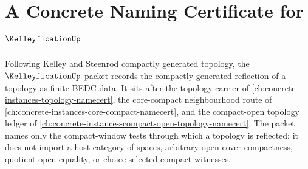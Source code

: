 \chapter{A Concrete Naming Certificate for $\KelleyficationUp$}
\label{ch:concrete-instances-kelleyfication-namecert}

Following Kelley and Steenrod compactly generated topology, the $\KelleyficationUp$ packet records the compactly generated reflection of a topology as finite BEDC data. It sits after the topology carrier of \autoref{ch:concrete-instances-topology-namecert}, the core-compact neighbourhood route of \autoref{ch:concrete-instances-core-compact-namecert}, and the compact-open topology ledger of \autoref{ch:concrete-instances-compact-open-topology-namecert}. The packet names only the compact-window tests through which a topology is reflected; it does not import a host category of spaces, arbitrary open-cover compactness, quotient-open equality, or choice-selected compact witnesses.

